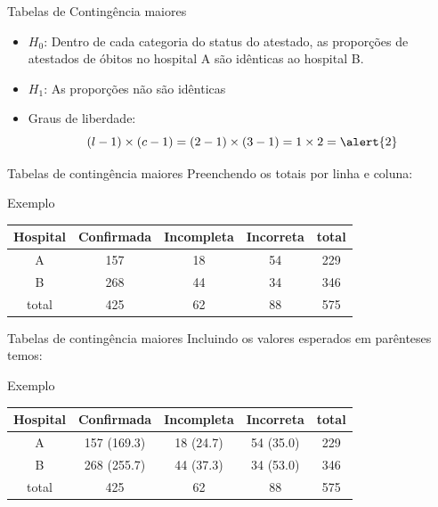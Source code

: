 \documentclass{beamer}
\begin{document}
\begin{frame}{Tabelas de Contingência maiores}
  \begin{itemize}
    \small
  \item $H_0$: Dentro de cada categoria do status do atestado, as
    proporções de atestados de óbitos no hospital A são idênticas ao
    hospital B.
  \item $H_1$: As proporções não são idênticas
  \item Graus de liberdade:
    \begin{displaymath}
      (l -1)\times (c-1) = (2-1) \times (3-1)
      = 1 \times 2 = \alert{2}
    \end{displaymath}
  \end{itemize}
\end{frame}

\begin{frame}{Tabelas de contingência maiores}
  Preenchendo os totais por linha e coluna:
  \begin{exampleblock}{Exemplo}
    \begin{tabular}{c|c|c|c|c}
      Hospital & Confirmada & Incompleta &
      Incorreta & total\\
      \hline
      A & 157 & 18 & 54 & 229\\
      \hline
      B & 268 & 44 & 34 & 346\\
      \hline
      total & 425 & 62 & 88 & 575\\
    \end{tabular}
  \end{exampleblock}
\end{frame}

\begin{frame}{Tabelas de contingência maiores}
  Incluindo os valores esperados em parênteses temos:
  \begin{exampleblock}{Exemplo}
    \begin{tabular}{c|c|c|c|c}
      Hospital & Confirmada & Incompleta &
      Incorreta & total\\
      \hline
      A & 157 (169.3) & 18 (24.7) & 54 (35.0) & 229\\
      \hline
      B & 268 (255.7) & 44 (37.3) & 34 (53.0) & 346\\
      \hline
      total & 425 & 62 & 88 & 575\\
    \end{tabular}
  \end{exampleblock}
\end{frame}
\end{document}
